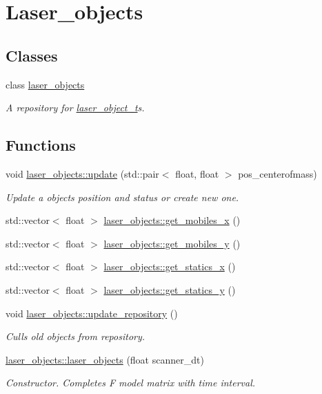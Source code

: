\hypertarget{group__laser__objects}{}\section{Laser\+\_\+objects}
\label{group__laser__objects}
\subsection*{Classes}
\begin{DoxyCompactItemize}
\item 
class \hyperlink{classlaser__objects}{laser\+\_\+objects}
\begin{DoxyCompactList}\small\item\em A repository for \hyperlink{classlaser__object__t}{laser\+\_\+object\+\_\+t}\textquotesingle{}s. \end{DoxyCompactList}\end{DoxyCompactItemize}
\subsection*{Functions}
\begin{DoxyCompactItemize}
\item 
void \hyperlink{group__laser__objects_ga8e139bb70c4e8589e512a71f244b45ef}{laser\+\_\+objects\+::update} (std\+::pair$<$ float, float $>$ pos\+\_\+centerofmass)
\begin{DoxyCompactList}\small\item\em Update a object\textquotesingle{}s position and status or create new one. \end{DoxyCompactList}\item 
std\+::vector$<$ float $>$ \hyperlink{group__laser__objects_ga5d288e741d7fca610899fd1b9f822826}{laser\+\_\+objects\+::get\+\_\+mobiles\+\_\+x} ()
\item 
std\+::vector$<$ float $>$ \hyperlink{group__laser__objects_gab76cec03e47705fcad27a2cf9d9b62a0}{laser\+\_\+objects\+::get\+\_\+mobiles\+\_\+y} ()
\item 
std\+::vector$<$ float $>$ \hyperlink{group__laser__objects_ga1f4e68699b3a5ea853dce7e45123a284}{laser\+\_\+objects\+::get\+\_\+statics\+\_\+x} ()
\item 
std\+::vector$<$ float $>$ \hyperlink{group__laser__objects_ga6063594fe030d1d8c33e6f4d2e1b3ef0}{laser\+\_\+objects\+::get\+\_\+statics\+\_\+y} ()
\item 
void \hyperlink{group__laser__objects_ga8491aebb670f24305deeb85a9da26ede}{laser\+\_\+objects\+::update\+\_\+repository} ()
\begin{DoxyCompactList}\small\item\em Culls old objects from repository. \end{DoxyCompactList}\item 
\hyperlink{group__laser__objects_ga9be2a1b55a49c0083bc37ac770ca2fa7}{laser\+\_\+objects\+::laser\+\_\+objects} (float scanner\+\_\+dt)
\begin{DoxyCompactList}\small\item\em Constructor. Completes F model matrix with time interval. \end{DoxyCompactList}\end{DoxyCompactItemize}


